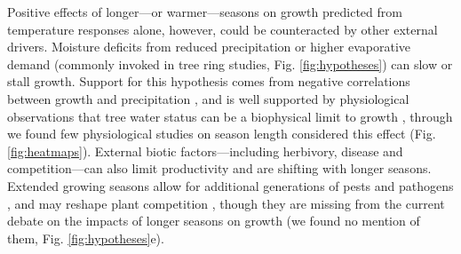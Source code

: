 \documentclass[11pt]{article}
\begin{document}
Positive effects of longer---or warmer---seasons on growth predicted from temperature responses alone, however, could be counteracted by other external drivers. Moisture deficits from reduced precipitation or higher evaporative demand (commonly invoked in tree ring studies, Fig. \ref{fig:hypotheses}) can slow or stall growth. Support for this hypothesis comes from negative correlations between growth and precipitation \citep[or other metrics related to plant access to water in tree ring studies,][]{kolavr2016response,etzold2022number}, and is well supported by physiological observations  that tree water status can be a biophysical limit to growth \citep[i.e., cells cannot expand without sufficient turgor,][]{peters2021turgor,cosgrove2023structure}, through we found few physiological studies on season length considered this effect (Fig. \ref{fig:heatmaps}). External biotic factors---including herbivory, disease and competition---can also limit productivity \citep{sturrock2011climate,la2008forest,senf2017remote} and are shifting with longer seasons. Extended growing seasons allow for additional generations of pests and pathogens \citep{mitton2012mountain,lange2006thresholds}, and may reshape plant competition \citep{cleland2024effects}, though they are missing from the current debate on the impacts of longer seasons on growth (we found no mention of them, Fig. \ref{fig:hypotheses}e). 
\end{document}
